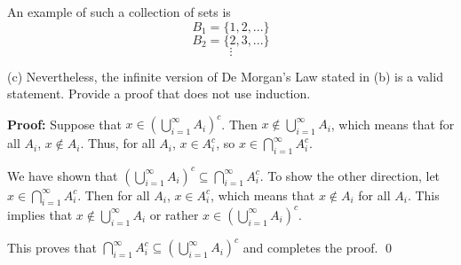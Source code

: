 \documentclass{article}
\begin{document}
An example of such a collection of sets is
$$B_1 = \{1,2,...\}$$
$$B_2 = \{2,3,...\}$$
$$\vdots$$

(c) Nevertheless, the infinite version of De Morgan’s Law stated in (b) is a
valid statement. Provide a proof that does not use induction.

\textbf{Proof:} Suppose that $x \in ( \bigcup_{i=1}^{\infty} A_i )^c$. Then $x \notin \bigcup_{i=1}^{\infty} A_i$, which means that for all $A_i$, $x \notin A_i$. Thus, for all $A_i$, $x \in A_i^c$, so $x \in \bigcap_{i=1}^{\infty} A_i^c$.

We have shown that $(\bigcup_{i=1}^{\infty} A_i )^c \subseteq \bigcap_{i=1}^{\infty} A_i^c$. To show the other direction, let $x \in \bigcap_{i=1}^{\infty} A_i^c$. Then for all $A_i$, $x \in A_i^c$, which means that $x \notin A_i$ for all $A_i$. This implies that $x \notin \bigcup_{i=1}^{\infty} A_i$ or rather $x \in (\bigcup_{i=1}^{\infty} A_i)^c$.

This proves that $\bigcap_{i=1}^{\infty} A_i^c \subseteq (\bigcup_{i=1}^{\infty} A_i )^c$ and completes the proof. \qed \\
\end{document}
